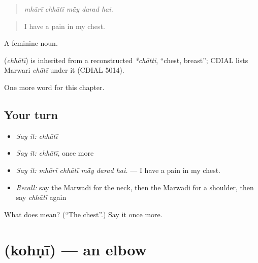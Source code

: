 \begin{quote}
    
\end{quote}

\begin{quote}
\emph{mhārī chhātī mā̃y darad hai.}
\end{quote}

\begin{quote}
I have a pain in my chest.
\end{quote}

A feminine noun.

\begin{cousinweb}
\textbf{} (\emph{chhātī}) is inherited from a reconstructed \emph{*chātti}, \textquotedblleft{}chest, breast\textquotedblright{}; CDIAL lists Marwari \emph{chātī} under it (CDIAL 5014).
\end{cousinweb}

\begin{grammarlens}[title={What you've built}]
One more word for this chapter.
\end{grammarlens}

\subsection*{Your turn}
\begin{itemize}
\raggedright
  \item \emph{Say it:} \emph{chhātī}
  \item \emph{Say it:} \emph{chhātī}, once more
  \item \emph{Say it:} \emph{mhārī chhātī mā̃y darad hai.} — I have a pain in my chest.
  \item \emph{Recall:} say the Marwadi for the neck, then the Marwadi for a shoulder, then say \emph{chhātī} again
\end{itemize}

\begin{tcolorbox}[breakable,colback=teal!4,colframe=teal!35!black,title={Before you move on}]
What does  mean? (\textquotedblleft{}The chest\textquotedblright{}.) Say it once more.
\end{tcolorbox}
\section[\texorpdfstring{\mw{कोहणी} (kohṇī)}{कोहणी (kohṇī)}]{ (kohṇī) — an elbow}

\label{lesson:MW-C251-kohni}



